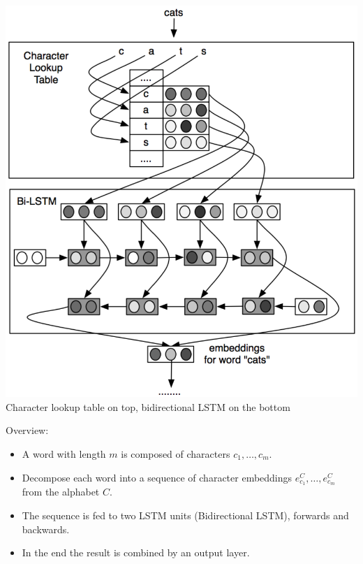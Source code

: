 \documentclass[11pt, a4paper, landscape]{article}
\begin{document}
\NewPage{}

\vfill
\begin{minipage}[b]{.4\linewidth}
  \begin{center}
    \includegraphics[width=\linewidth]{../article/img/bi-lstm-emeddings}\\
    Character lookup table on top, bidirectional LSTM on the bottom
  \end{center}
\end{minipage}
\begin{minipage}[b]{.6\linewidth}
  Overview:
  \begin{itemize}
  \item A word with length $m$ is composed of characters $c_1, \dots, c_m$.
  \item Decompose each word into a sequence of character embeddings $e_{c_1}^C, \dots, e_{c_m}^C$ from the alphabet $C$.
  \item The sequence is fed to two LSTM units (Bidirectional LSTM), forwards and backwards.
  \item In the end the result is combined by an output layer.
  \end{itemize}
\end{minipage}
\vfill
\end{document}
